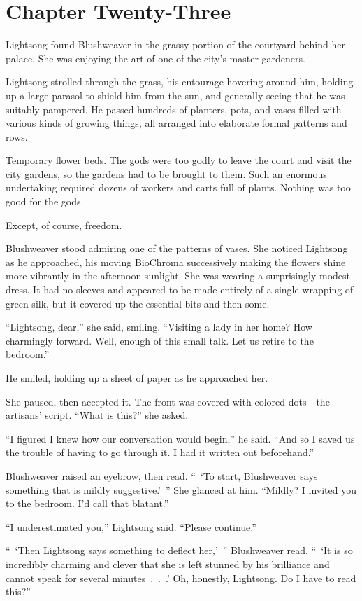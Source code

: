 \section{Chapter Twenty-Three}

Lightsong found Blushweaver in the grassy portion of the courtyard behind her palace. She was enjoying the art of one of the city’s master gardeners.

Lightsong strolled through the grass, his entourage hovering around him, holding up a large parasol to shield him from the sun, and generally seeing that he was suitably pampered. He passed hundreds of planters, pots, and vases filled with various kinds of growing things, all arranged into elaborate formal patterns and rows.

Temporary flower beds. The gods were too godly to leave the court and visit the city gardens, so the gardens had to be brought to them. Such an enormous undertaking required dozens of workers and carts full of plants. Nothing was too good for the gods.

Except, of course, freedom.

Blushweaver stood admiring one of the patterns of vases. She noticed Lightsong as he approached, his moving BioChroma successively making the flowers shine more vibrantly in the afternoon sunlight. She was wearing a surprisingly modest dress. It had no sleeves and appeared to be made entirely of a single wrapping of green silk, but it covered up the essential bits and then some.

“Lightsong, dear,” she said, smiling. “Visiting a lady in her home? How charmingly forward. Well, enough of this small talk. Let us retire to the bedroom.”

He smiled, holding up a sheet of paper as he approached her.

She paused, then accepted it. The front was covered with colored dots—the artisans’ script. “What is this?” she asked.

“I figured I knew how our conversation would begin,” he said. “And so I saved us the trouble of having to go through it. I had it written out beforehand.”

Blushweaver raised an eyebrow, then read. “~‘To start, Blushweaver says something that is mildly suggestive.’~” She glanced at him. “Mildly? I invited you to the bedroom. I’d call that blatant.”

“I underestimated you,” Lightsong said. “Please continue.”

“~‘Then Lightsong says something to deflect her,’~” Blushweaver read. “~‘It is so incredibly charming and clever that she is left stunned by his brilliance and cannot speak for several minutes~.~.~.’ Oh, honestly, Lightsong. Do I have to read this?”

